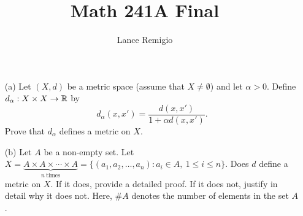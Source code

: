 \documentclass[a4paper]{article}
\title{Math 241A Final}
\author{Lance Remigio}
\begin{document}
\maketitle

\begin{problem}
  \begin{enumerate}
      \item[(a)] Let \( (X,d) \) be a metric space (assume that \( X \neq \emptyset \)) and let \( \alpha > 0  \). Define \( {d}_{\alpha}: X \times X \to \mathbb{R}  \) by 
          \[ {d}_{\alpha}(x, x') = \frac{ d(x,x') }{ 1 + \alpha d(x,x')  }. \]
          Prove that \( {d}_{\alpha}   \) defines a metric on \( X  \).
      \item[(b)] Let \( A  \) be a non-empty set. Let \( X = \underbrace{A \times A \times \cdots \times A}_{ n  \ \text{times}} = \{ ({a}_{1}, {a}_{2}, \dots, {a}_{n}) : {a}_{i} \in A, \ 1 \leq i \leq n  \}   \). Does \( d  \) define a metric on \( X  \). If it does, provide a detailed proof. If it does not, justify in detail why it does not. Here, \( \# A  \) denotes the number of elements in the set \( A  \).
  \end{enumerate}  
\end{problem}
\end{document}
